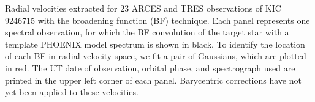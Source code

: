 \label{fig:bffig} Radial velocities extracted for 23 ARCES and TRES observations of KIC 9246715 with the broadening function (BF) technique. Each panel represents one spectral observation, for which the BF convolution of the target star with a template PHOENIX model spectrum is shown in black. To identify the location of each BF in radial velocity space, we fit a pair of Gaussians, which are plotted in red. The UT date of observation, orbital phase, and spectrograph used are printed in the upper left corner of each panel. Barycentric corrections have not yet been applied to these velocities.